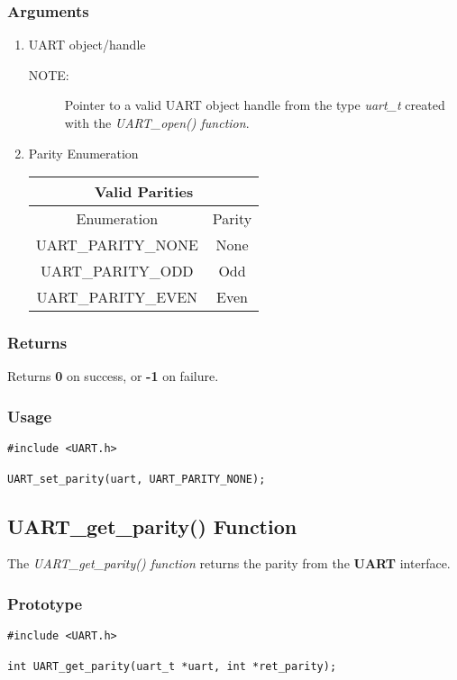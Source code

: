 \documentclass{report}
\begin{document}
\subsubsection*{Arguments}
\begin{enumerate}
\item UART object/handle
\begin{description}
\item[NOTE:] Pointer to a valid UART object handle from the type \textit{uart\_t}
created with the \textit{UART\_open() function}.
\end{description}
\item Parity Enumeration
\newline
\newline
\begin{tabular}{| c | c |}
\hline
\multicolumn{2}{|c|}{Valid Parities} \\
\hline
Enumeration & Parity \\
\hline
UART\_PARITY\_NONE & None \\
UART\_PARITY\_ODD & Odd \\
UART\_PARITY\_EVEN & Even \\
\hline
\end{tabular}
\end{enumerate}
\subsubsection*{Returns}
Returns \textbf{0} on success, or \textbf{-1} on failure.
\subsubsection*{Usage}
\begin{lstlisting}
#include <UART.h>

UART_set_parity(uart, UART_PARITY_NONE);
\end{lstlisting}
\subsection{UART\_get\_parity() Function}
The \textit{UART\_get\_parity() function} returns the parity
from the \textbf{UART} interface.
\subsubsection*{Prototype}
\begin{lstlisting}
#include <UART.h>

int UART_get_parity(uart_t *uart, int *ret_parity);
\end{lstlisting}
\end{document}
